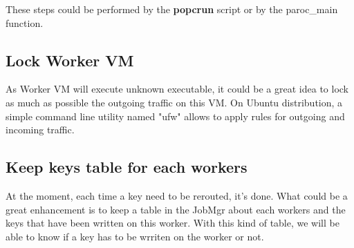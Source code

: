 These steps could be performed by the \textbf{popcrun} script or by the paroc\_main function. 

\subsection{Lock Worker VM}
As Worker VM will execute unknown executable, it could be a great idea to lock as much as possible the outgoing traffic on this VM. On Ubuntu distribution, a simple command line utility named "ufw" allows to apply rules for outgoing and incoming traffic.



\subsection{Keep keys table for each workers}
At the moment, each time a key need to be rerouted, it's done. What could be a great enhancement is to keep a table in the JobMgr about each workers and the keys that have been written on this worker. With this kind of table, we will be able to know if a key has to be wrriten on the worker or not. 